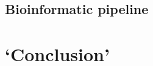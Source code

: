     \subsection{Bioinformatic pipeline}

\begin{comment}
\begin{itemize}
            \item{Different samples}
            \item{Technology: wet lab but also software: Rupgrade, \ldots}
            \item{missing meta-data}
        \end{itemize}
    \subsection{Main concerns}
        \subsubsection{Detection}
        \subsubsection{Quantification}
    \subsection{Consistency through biological layers}
\end{comment}





\section{`Conclusion'}

\begin{comment}
\Rnaseq\ as \Dnaseq\ needs many corrections as to prevent biases in the downstream
analysis. However, due to the dynamic component of the transcriptome
contrarily to the genome, while it is possible to apply the corrections in
\Dnaseq\ and then analyse the data \mycite{dnaseqCorr},
in \Rnaseq, corrections are already part of
the analysis and requires often as much skills than flair. It is possible that
future protocols will overcome this issue.
\end{comment}


